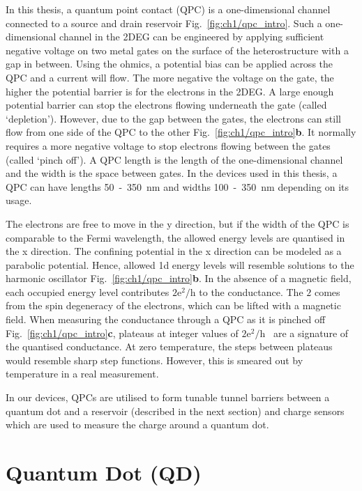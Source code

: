 In this thesis, a quantum point contact (QPC) is a one-dimensional channel connected to a source and drain reservoir Fig.~\ref{fig:ch1/qpc_intro}. Such a one-dimensional channel in the 2DEG can be engineered by applying sufficient negative voltage on two metal gates on the surface of the heterostructure with a gap in between. Using the ohmics, a potential bias can be applied across the QPC and a current will flow. The more negative the voltage on the gate, the higher the potential barrier is for the electrons in the 2DEG. A large enough potential barrier can stop the electrons flowing underneath the gate (called `depletion'). However, due to the gap between the gates, the electrons can still flow from one side of the QPC to the other Fig.~\ref{fig:ch1/qpc_intro}\textbf{b}. It normally requires a more negative voltage to stop electrons flowing between the gates (called `pinch off'). A QPC length is the length of the one-dimensional channel and the width is the space between gates. In the devices used in this thesis, a QPC can have lengths 50~-~\qty{350}{nm} and widths 100~-~\qty{350}{nm} depending on its usage.

The electrons are free to move in the y direction, but if the width of the QPC is comparable to the Fermi wavelength, the allowed energy levels are quantised in the x direction. The confining potential in the x direction can be modeled as a parabolic potential. Hence, allowed 1d energy levels will resemble solutions to the harmonic oscillator Fig.~\ref{fig:ch1/qpc_intro}\textbf{b}. In the absence of a magnetic field, each occupied energy level contributes $\mathrm{2e^2/h}$ to the conductance. The $2$ comes from the spin degeneracy of the electrons, which can be lifted with a magnetic field. When measuring the conductance through a QPC as it is pinched off Fig.~\ref{fig:ch1/qpc_intro}\textbf{c}, plateaus at integer values of $\mathrm{2e^2/h}$~\cite{qpc_first_measurement} are a signature of the quantised conductance. At zero temperature, the steps between plateaus would resemble sharp step functions. However, this is smeared out by temperature in a real measurement.

In our devices, QPCs are utilised to form tunable tunnel barriers between a quantum dot and a reservoir (described in the next section) and charge sensors~\cite{cs_first_measurement} which are used to measure the charge around a quantum dot. 




\afterpage{\clearpage}
\section{Quantum Dot (QD)}

